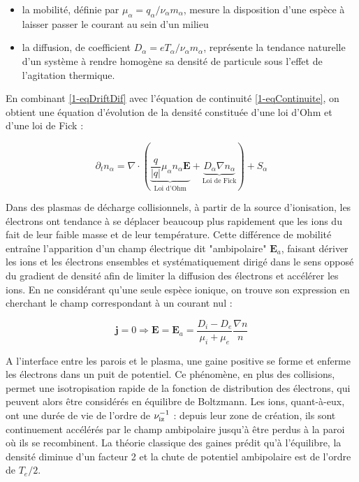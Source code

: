 \begin{refsection}
\begin{itemize}
  \item la mobilité, définie par $\mu_\alpha=q_\alpha/\nu_\alpha m_\alpha$,
  mesure la disposition d'une espèce à laisser passer le courant au sein d'un milieu
  \item la diffusion, de coefficient $D_\alpha=eT_\alpha/\nu_\alpha m_\alpha$,
  représente la tendance naturelle d'un système à rendre homogène sa densité de particule sous l'effet
  de l'agitation thermique.
\end{itemize}

En combinant \eqref{1-eqDriftDif} avec l'équation de continuité
\eqref{1-eqContinuite}, on obtient une équation d'évolution de la densité
constituée d'une loi d'Ohm et d'une loi de Fick :
 
\begin{equation}
\label{1-eqDriftDifContinuite}
\partial_t n_\alpha=\nabla\cdot(\underbrace{\frac{q}{|q|}\mu_\alpha n_\alpha\mathbf
E}_\text{Loi d'Ohm}+\underbrace{D_\alpha{\nabla n_\alpha}}_\text{Loi
de Fick})+S_\alpha
\end{equation}

Dans des plasmas de décharge collisionnels, à partir de la source d'ionisation,
les électrons ont tendance à se déplacer beaucoup plus rapidement que les ions
du fait de leur faible masse et de leur température. Cette différence de
mobilité entraîne l'apparition d'un champ électrique dit "ambipolaire"
$\mathbf E_a$, faisant dériver les ions et les électrons ensembles et
systématiquement dirigé dans le sens opposé du gradient de densité afin de
limiter la diffusion des électrons et accélérer les ions. En ne considérant
qu'une seule espèce ionique, on trouve son expression en cherchant le champ
correspondant à un courant nul :
 
\begin{equation}
\label{1-eqEAmb}
\mathbf j=0 \Rightarrow \mathbf E=\mathbf
E_a=\frac{D_i-D_e}{\mu_i+\mu_e}\frac{\nabla n}{n}
\end{equation}

A l'interface entre les parois et le plasma, une gaine positive se
forme et enferme les électrons dans un puit de potentiel. Ce phénomène, en plus
des collisions, permet une isotropisation rapide de la fonction de distribution
des électrons, qui peuvent alors être considérés en équilibre de Boltzmann.
Les ions, quant-à-eux, ont une durée de vie de l'ordre de
$\nu_\text{iz}^{{-1}}$ : depuis leur zone de création, ils sont
continuement accélérés par le champ ambipolaire jusqu'à être perdus à la paroi
où ils se recombinent. La théorie classique des gaines prédit qu'à l'équilibre,
la densité diminue d'un facteur 2 et la chute de potentiel ambipolaire est
de l'ordre de $T_e/2$.


\end{refsection}
